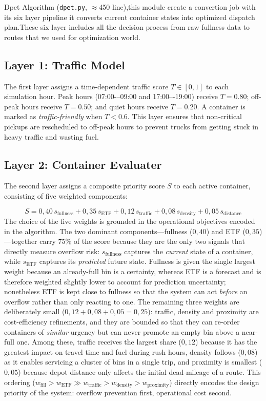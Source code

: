 \documentclass[12pt,a4paper]{report}
\begin{document}
\indent Dpet Algorithm (\texttt{dpet.py}, $\approx$450 line),this module create a convertion job with its six layer pipeline it converts current container states into optimized dispatch plan.These six layer includes all the decision process from raw fullness data to routes that we used for optimization world.
\clearpage
\subsection{Layer 1: Traffic Model}
\indent The first layer assigns a time-dependent traffic score $T \in [0, 1]$ to each simulation hour. Peak hours (07:00-–09:00 and 17:00–-19:00) receive $T = 0.80$; off-peak hours receive $T = 0.50$; and quiet hours receive $T = 0.20$. A container is marked as \textit{traffic-friendly} when $T < 0.6$. This layer ensures that non-critical pickups are rescheduled to off-peak hours to prevent trucks from getting stuck in heavy traffic and wasting fuel.


\subsection{Layer 2: Container Evaluater}

\indent The second layer assigns a composite priority score $S$ to each active container, consisting of five weighted components:

\begin{equation}
  S = 0{,}40\,s_{\text{fullness}} + 0{,}35\,s_{\text{ETF}} + 0{,}12\,s_{\text{traffic}} + 0{,}08\,s_{\text{density}} + 0{,}05\,s_{\text{distance}}
  \label{eq:bin_score}
\end{equation}
\indent The choice of the five weights is grounded in the operational
objectives encoded in the algorithm. The two dominant components---fullness
($0{,}40$) and ETF ($0{,}35$)---together carry $75\%$ of the score because they
are the only two signals that directly measure overflow risk: $s_{\text{fullness}}$
captures the \textit{current} state of a container, while $s_{\text{ETF}}$
captures its \textit{predicted} future state. Fullness is given the single
largest weight because an already-full bin is a certainty, whereas ETF is a
forecast and is therefore weighted slightly lower to account for prediction
uncertainty; nonetheless ETF is kept close to fullness so that the system can
act \textit{before} an overflow rather than only reacting to one. The remaining
three weights are deliberately small ($0{,}12 + 0{,}08 + 0{,}05 = 0{,}25$): traffic,
density and proximity are cost-efficiency refinements, and they are bounded so
that they can re-order containers of \textit{similar} urgency but can never
promote an empty bin above a near-full one. Among these, traffic receives the
largest share ($0{,}12$) because it has the greatest impact on travel time and
fuel during rush hours, density follows ($0{,}08$) as it enables servicing a
cluster of bins in a single trip, and proximity is smallest ($0{,}05$) because
depot distance only affects the initial dead-mileage of a route. This ordering
($w_{\text{fill}} > w_{\text{ETF}} \gg w_{\text{traffic}} > w_{\text{density}} >
w_{\text{proximity}}$) directly encodes the design priority of the system:
overflow prevention first, operational cost second.
\end{document}
